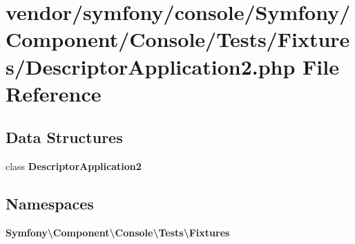 \section{vendor/symfony/console/\+Symfony/\+Component/\+Console/\+Tests/\+Fixtures/\+Descriptor\+Application2.php File Reference}
\label{_descriptor_application2_8php}
\subsection*{Data Structures}
\begin{DoxyCompactItemize}
\item 
class {\bf Descriptor\+Application2}
\end{DoxyCompactItemize}
\subsection*{Namespaces}
\begin{DoxyCompactItemize}
\item 
 {\bf Symfony\textbackslash{}\+Component\textbackslash{}\+Console\textbackslash{}\+Tests\textbackslash{}\+Fixtures}
\end{DoxyCompactItemize}
